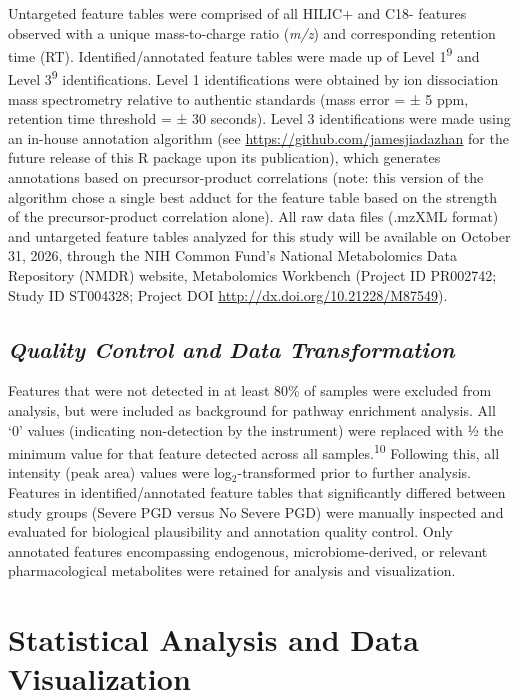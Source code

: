 \documentclass[
]{article}
\begin{document}
\noindent\hspace{1.5em}Untargeted feature tables were comprised of all
HILIC+ and C18- features observed with a unique mass-to-charge ratio
(\textit{m/z}) and corresponding retention time (RT).
Identified/annotated feature tables were made up of Level
1\textsuperscript{9} and Level 3\textsuperscript{9} identifications.
Level 1 identifications were obtained by ion dissociation mass
spectrometry relative to authentic standards (mass error = ± 5 ppm,
retention time threshold = ± 30 seconds). Level 3 identifications were
made using an in-house annotation algorithm (see
\url{https://github.com/jamesjiadazhan} for the future release of this R
package upon its publication), which generates annotations based on
precursor-product correlations (note: this version of the algorithm
chose a single best adduct for the feature table based on the strength
of the precursor-product correlation alone). All raw data files (.mzXML
format) and untargeted feature tables analyzed for this study will be
available on October 31, 2026, through the NIH Common Fund's National
Metabolomics Data Repository (NMDR) website, Metabolomics Workbench
(Project ID PR002742; Study ID ST004328; Project DOI
\url{http://dx.doi.org/10.21228/M87549}).

\subsection{\texorpdfstring{\emph{Quality Control and Data
Transformation}}{Quality Control and Data Transformation}}\label{quality-control-and-data-transformation}

Features that were not detected in at least 80\% of samples were
excluded from analysis, but were included as background for pathway
enrichment analysis. All `0' values (indicating non-detection by the
instrument) were replaced with ½ the minimum value for that feature
detected across all samples.\textsuperscript{10} Following this, all
intensity (peak area) values were log\(_2\)-transformed prior to further
analysis. Features in identified/annotated feature tables that
significantly differed between study groups (Severe PGD versus No Severe
PGD) were manually inspected and evaluated for biological plausibility
and annotation quality control. Only annotated features encompassing
endogenous, microbiome-derived, or relevant pharmacological metabolites
were retained for analysis and visualization.

\section{\texorpdfstring{\textbf{Statistical Analysis and Data
Visualization}}{Statistical Analysis and Data Visualization}}\label{statistical-analysis-and-data-visualization}
\end{document}
